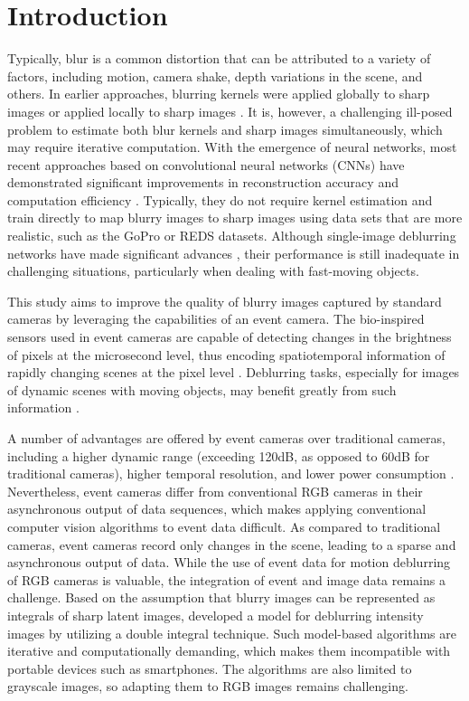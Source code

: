 \documentclass{article}
\begin{document}
\section{Introduction}
\label{sec:intro}
Typically, blur is a common distortion that can be attributed to a variety of factors, including motion, camera shake, depth variations in the scene, and others. In earlier approaches, blurring kernels were applied globally to sharp images or applied locally to sharp images \cite{classic-1}. It is, however, a challenging ill-posed problem to estimate both blur kernels and sharp images simultaneously, which may require iterative computation. With the emergence of neural networks, most recent approaches based on convolutional neural networks (CNNs) have demonstrated significant improvements in reconstruction accuracy and computation efficiency \cite{GoPro, SRN, MPRNET, BANet, MIMO}. Typically, they do not require kernel estimation and train directly to map blurry images to sharp images using data sets that are more realistic, such as the GoPro \cite{GoPro} or REDS \cite{REDS} datasets. Although single-image deblurring networks have made significant advances \cite{BANet, MIMO, Nafnet, restormer}, their performance is still inadequate in challenging situations, particularly when dealing with fast-moving objects.

This study aims to improve the quality of blurry images captured by standard cameras by leveraging the capabilities of an event camera. The bio-inspired sensors used in event cameras are capable of detecting changes in the brightness of pixels at the microsecond level, thus encoding spatiotemporal information of rapidly changing scenes at the pixel level \cite{eventCamera1, eventCamera2, eventCamera3}. Deblurring tasks, especially for images of dynamic scenes with moving objects, may benefit greatly from such information \cite{BHA, LEBMD, MADANet, EFNet}.

A number of advantages are offered by event cameras over traditional cameras, including a higher dynamic range (exceeding 120dB, as opposed to 60dB for traditional cameras), higher temporal resolution, and lower power consumption \cite{eventsurvey}. Nevertheless, event cameras differ from conventional RGB cameras in their asynchronous output of data sequences, which makes applying conventional computer vision algorithms to event data difficult. As compared to traditional cameras, event cameras record only changes in the scene, leading to a sparse and asynchronous output of data. While the use of event data for motion deblurring of RGB cameras is valuable, the integration of event and image data remains a challenge. Based on the assumption that blurry images can be represented as integrals of sharp latent images, \cite{BHA} developed a model for deblurring intensity images by utilizing a double integral technique. Such model-based algorithms are iterative and computationally demanding, which makes them incompatible with portable devices such as smartphones. The algorithms are also limited to grayscale images, so adapting them to RGB images remains challenging.
\end{document}
